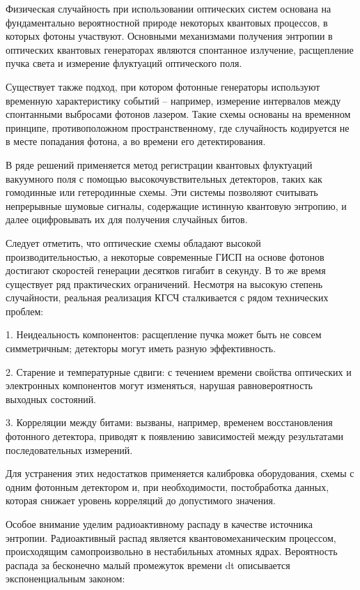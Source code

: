 Физическая случайность при использовании оптических систем основана на
фундаментально вероятностной природе некоторых квантовых процессов, в
которых фотоны участвуют. Основными механизмами получения энтропии в
оптических квантовых генераторах являются спонтанное излучение,
расщепление пучка света и измерение флуктуаций оптического поля.

Существует также подход, при котором фотонные генераторы используют
временную характеристику событий -- например, измерение интервалов между
спонтанными выбросами фотонов лазером. Такие схемы основаны на временном
принципе, противоположном пространственному, где случайность кодируется
не в месте попадания фотона, а во времени его детектирования.

В ряде решений применяется метод регистрации квантовых флуктуаций
вакуумного поля с помощью высокочувствительных детекторов, таких как
гомодинные или гетеродинные схемы. Эти системы позволяют считывать
непрерывные шумовые сигналы, содержащие истинную квантовую энтропию, и
далее оцифровывать их для получения случайных битов.

Следует отметить, что оптические схемы обладают высокой
производительностью, а некоторые современные ГИСП на основе фотонов
достигают скоростей генерации десятков гигабит в секунду. В то же время
существует ряд практических ограничений. Несмотря на высокую степень
случайности, реальная реализация КГСЧ сталкивается с рядом технических
проблем:

1. Неидеальность компонентов: расщепление пучка может быть не совсем
симметричным; детекторы могут иметь разную эффективность.

2. Старение и температурные сдвиги: с течением времени свойства
оптических и электронных компонентов могут изменяться, нарушая
равновероятность выходных состояний.

3. Корреляции между битами: вызваны, например, временем восстановления
фотонного детектора, приводят к появлению зависимостей между
результатами последовательных измерений.

Для устранения этих недостатков применяется калибровка оборудования,
схемы с одним фотонным детектором и, при необходимости, постобработка
данных, которая снижает уровень корреляций до допустимого значения.

Особое внимание уделим радиоактивному распаду в качестве источника
энтропии. Радиоактивный распад является квантовомеханическим процессом,
происходящим самопроизвольно в нестабильных атомных ядрах. Вероятность
распада за бесконечно малый промежуток времени dt описывается
экспоненциальным законом:

